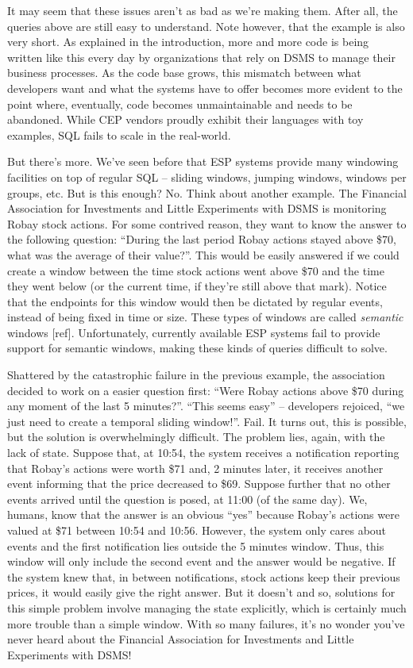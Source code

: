 \documentclass{report}
\begin{document}
It may seem that these issues aren't as bad as we're making them. After all, the queries above are still easy to understand. Note however, that the example is also very short. As explained in the introduction, more and more code is being written like this every day by organizations that rely on DSMS to manage their business processes. As the code base grows, this mismatch between what developers want and what the systems have to offer becomes more evident to the point where, eventually, code becomes unmaintainable and needs to be abandoned. While CEP vendors proudly exhibit their languages with toy examples, SQL fails to scale in the real-world.

But there's more. We've seen before that ESP systems provide many windowing facilities on top of regular SQL -- sliding windows, jumping windows, windows per groups, etc. But is this enough? No. Think about another example. The Financial Association for Investments and Little Experiments with DSMS is monitoring Robay stock actions. For some contrived reason, they want to know the answer to the following question: ``During the last period Robay actions stayed above \$70, what was the average of their value?''. This would be easily answered if we could create a window between the time stock actions went above \$70 and the time they went below (or the current time, if they're still above that mark). Notice that the endpoints for this window would then be dictated by regular events, instead of being fixed in time or size. These types of windows are called \emph{semantic} windows [ref]. Unfortunately, currently available ESP systems fail to provide support for semantic windows, making these kinds of queries difficult to solve.

Shattered by the catastrophic failure in the previous example, the association decided to work on a easier question first: ``Were Robay actions above \$70 during any moment of the last 5 minutes?''. ``This seems easy'' -- developers rejoiced, ``we just need to create a temporal sliding window!''. Fail. It turns out, this is possible, but the solution is overwhelmingly difficult. The problem lies, again, with the lack of state. Suppose that, at 10:54, the system receives a notification reporting that Robay's actions were worth \$71 and, 2 minutes later, it receives another event informing that the price decreased to \$69. Suppose further that no other events arrived until the question is posed, at 11:00 (of the same day). We, humans, know that the answer is an obvious ``yes'' because Robay's actions were valued at \$71 between 10:54 and 10:56. However, the system only cares about events and the first notification lies outside the 5 minutes window. Thus, this window will only include the second event and the answer would be negative. If the system knew that, in between notifications, stock actions keep their previous prices, it would easily give the right answer. But it doesn't and so, solutions for this simple problem involve managing the state explicitly, which is certainly much more trouble than a simple window. With so many failures, it's no wonder you've never heard about the Financial Association for Investments and Little Experiments with DSMS!
\end{document}
